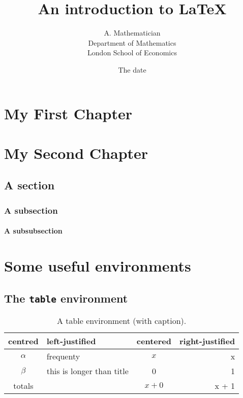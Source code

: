 \documentclass[a4paper,oneside]{book}
\title{An introduction to \LaTeX}
\author{A. Mathematician\\[12pt]
Department of Mathematics\\[6pt]
        London School of Economics}
\date{The date}
\begin{document}
\maketitle

\tableofcontents
\listoffigures
\listoftables



\chapter{My First Chapter}



\chapter{My Second Chapter}
\section{A section}
\subsection{A subsection}
\subsubsection{A subsubsection}



\chapter{Some useful environments}


\section{The \texttt{table} environment}

\begin{table}[h]
\begin{center}
\begin{tabular}{c | l c r}
centred & left-justified & centered & right-justified \\ \hline
$\alpha$ & frequenty & $x$ & x \\\cline{1-1}
$\beta$ & this is longer than title & 0 & 1\\\cline{3-4}
totals &  & $x + 0$ & x + 1
\end{tabular}
\end{center}
\caption{A table environment (with caption).}
\end{table}
\end{document}
